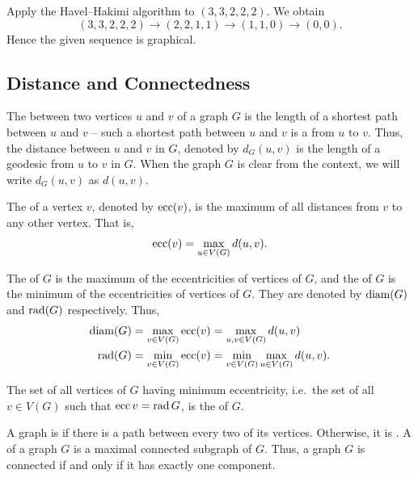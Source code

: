 \begin{Example}
Apply the Havel--Hakimi algorithm to $(3,3,2,2,2)$. We obtain
\begin{equation*}
(3,3,2,2,2)
\longrightarrow (2,2,1,1)
\longrightarrow (1,1,0)
\longrightarrow (0,0).
\end{equation*}
Hence the given sequence is graphical.
\end{Example}

\subsection{Distance and Connectedness}

The  between two vertices $u$ and $v$ of a graph $G$ is the length of a shortest path between $u$ and $v$ -- such a shortest path between $u$ and $v$ is a  from $u$ to $v$. Thus, the distance between $u$ and $v$ in $G$, denoted by $d_G(u, v)$ is the length of a geodesic from $u$ to $v$ in $G$. When the graph $G$ is clear from the context, we will write $d_G(u, v)$ as $d(u, v)$.

The  of a vertex $v$, denoted by $\operatorname{ecc}(v)$, is the maximum of all distances from $v$ to any other vertex. That is,
\begin{equation*}
    \operatorname{ecc}(v) = \max_{u \in V(G)} d(u, v) .
\end{equation*}

The  of $G$ is the maximum of the eccentricities of vertices of $G$, and the  of $G$ is the minimum of the eccentricities of vertices of $G$. They are denoted by $\operatorname{diam}(G)$ and $\operatorname{rad}(G)$ respectively. Thus,
\begin{align*}
    \operatorname{diam}(G) & = \max_{v \in V(G)} \operatorname{ecc}(v)= \max_{u, v \in V(G)} d(u, v) \\
    \operatorname{rad}(G) & = \min_{v \in V(G)}\operatorname{ecc}(v) = \min_{v \in V(G)} \max_{u \in V(G)} d(u, v).
\end{align*}

The set of all vertices of $G$ having minimum eccentricity, i.e.\ the set of all $v \in V(G)$ such that $\operatorname{ecc} v = \operatorname{rad} G$, is the  of $G$.

A graph is  if there is a path between every two of its vertices. Otherwise, it is . A  of a graph $G$ is a maximal connected subgraph of $G$. Thus, a graph $G$ is connected if and only if it has exactly one component.

